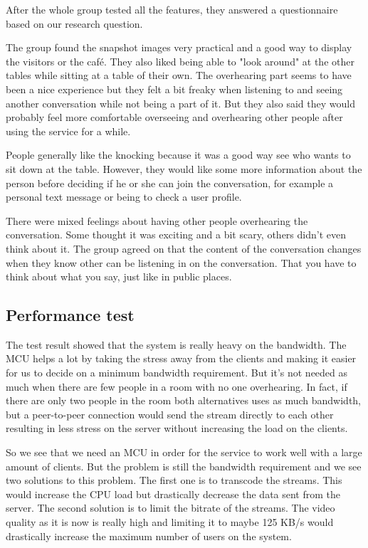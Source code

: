 \documentclass[12pt, titlepage]{article}
\begin{document}
After the whole group tested all the features, they answered a questionnaire based on our research question.

The group found the snapshot images very practical and a good way to display the visitors or the café. They also liked being able to "look around" at the other tables while sitting at a table of their own. The overhearing part seems to have been a nice experience but they felt a bit freaky when listening to and seeing another conversation while not being a part of it. But they also said they would probably feel more comfortable overseeing and overhearing other people after using the service for a while.

People generally like the knocking because it was a good way see who wants to sit down at the table. However, they would like some more information about the person before deciding if he or she can join the conversation, for example a personal text message or being to check a user profile.

There were mixed feelings about having other people overhearing the conversation. Some thought it was exciting and a bit scary, others didn't even think about it. The group agreed on that the content of the conversation changes when they know other can be listening in on the conversation. That you have to think about what you say, just like in public places.

\subsection{Performance test}
The test result showed that the system is really heavy on the bandwidth. The MCU helps a lot by taking the stress away from the clients and making it easier for us to decide on a minimum bandwidth requirement. But it's not needed as much when there are few people in a room with no one overhearing. In fact, if there are only two people in the room both alternatives uses as much bandwidth, but a peer-to-peer connection would send the stream directly to each other resulting in less stress on the server without increasing the load on the clients.

So we see that we need an MCU in order for the service to work well with a large amount of clients. But the problem is still the bandwidth requirement and we see two solutions to this problem. The first one is to transcode the streams. This would increase the CPU load but drastically decrease the data sent from the server. The second solution is to limit the bitrate of the streams. The video quality as it is now is really high and limiting it to maybe 125 KB/s would drastically increase the maximum number of users on the system.
\end{document}
